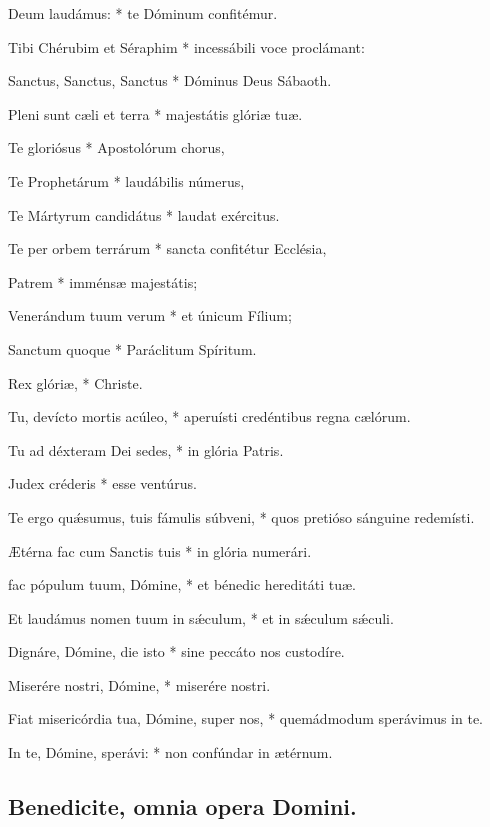 { Deum laudámus: * te Dóminum confitémur.\par
{}
Tibi Chérubim et Séraphim * incessábili voce proclámant:\par
Sanctus, Sanctus, Sanctus * Dóminus Deus Sábaoth.\par
Pleni sunt c{\ae}li et terra * majestátis glóri{\ae} tu{\ae}.\par
Te gloriósus * Apostolórum chorus,\par
Te Prophetárum * laudábilis númerus,\par
Te Mártyrum candidátus * laudat exércitus.\par
Te per orbem terrárum * sancta confitétur Ecclésia,\par
Patrem * imméns{\ae} majestátis;\par
Venerándum tuum verum * et únicum Fílium;\par
Sanctum quoque * Paráclitum Spíritum.

 Rex glóri{\ae}, * Christe.\par
{}
Tu, devícto mortis acúleo, * aperuísti credéntibus regna c{\ae}lórum.\par
Tu ad déxteram Dei sedes, * in glória Patris.\par
Judex créderis * esse ventúrus. \par
Te ergo quǽsumus, tuis fámulis súbveni, * quos pretióso sánguine redemísti.\par
{\AE}térna fac cum Sanctis tuis * in glória numerári.\par
{} fac pópulum tuum, Dómine, * et bénedic hereditáti tu{\ae}.\par
{}
Et laudámus nomen tuum in sǽculum, * et in sǽculum sǽculi.\par
Dignáre, Dómine, die isto * sine peccáto nos custodíre.\par
Miserére nostri, Dómine, * miserére nostri.\par
Fiat misericórdia tua, Dómine, super nos, * quemádmodum sperávimus in te.\par
In te, Dómine, sperávi: * non confúndar in {\ae}térnum.}


\subsection{Benedicite, omnia opera Domini.}

